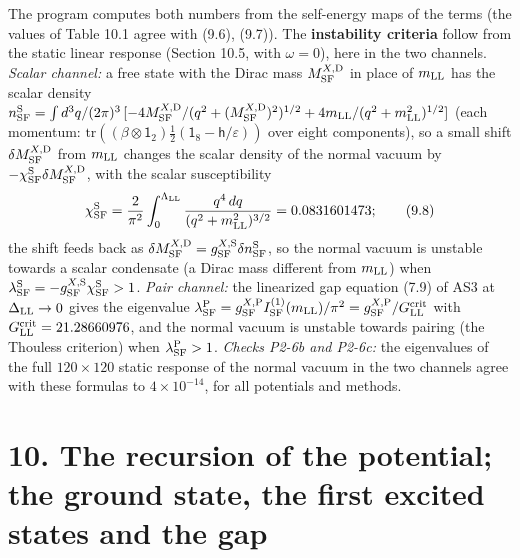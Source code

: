 \documentclass[
  10pt,
]{article}
\begin{document}
The program computes both numbers from the self-energy maps of the terms
(the values of Table 10.1 agree with (9.6), (9.7)). The
\textbf{instability criteria} follow from the static linear response
(Section 10.5, with \(\omega=0\)), here in the two channels.
\emph{Scalar channel:} a free state with the Dirac mass
\(M^{X,{\rm D}}_{\rm SF}\) in place of \(m_{\rm LL}\) has the scalar
density
\(n^{\rm S}_{\rm SF}=\int d^3q/(2\pi)^3\,[-4M^{X,{\rm D}}_{\rm SF}/(q^2+(M^{X,{\rm D}}_{\rm SF})^2)^{1/2}+4m_{\rm LL}/(q^2+m_{\rm LL}^2)^{1/2}]\)
(each momentum:
\(\mathrm{tr}((\beta\otimes\mathsf 1_2)\tfrac12(\mathsf 1_8-\mathsf h/\varepsilon))\)
over eight components), so a small shift
\(\delta M^{X,{\rm D}}_{\rm SF}\) from \(m_{\rm LL}\) changes the scalar
density of the normal vacuum by
\(-\chi^{\rm S}_{\rm SF}\delta M^{X,{\rm D}}_{\rm SF}\), with the scalar
susceptibility
\[\chi^{\rm S}_{\rm SF}=\frac2{\pi^2}\int_0^{\Lambda_{\rm LL}}\frac{q^4\,dq}{(q^2+m_{\rm LL}^2)^{3/2}}=0.0831601473;\tag{9.8}\]
the shift feeds back as
\(\delta M^{X,{\rm D}}_{\rm SF}=g^{X,{\rm S}}_{\rm SF}\delta n^{\rm S}_{\rm SF}\),
so the normal vacuum is unstable towards a scalar condensate (a Dirac
mass different from \(m_{\rm LL}\)) when
\(\lambda^{\rm S}_{\rm SF}=-g^{X,{\rm S}}_{\rm SF}\chi^{\rm S}_{\rm SF}>1\).
\emph{Pair channel:} the linearized gap equation (7.9) of AS3 at
\(\Delta_{\rm LL}\to0\) gives the eigenvalue
\(\lambda^{\rm P}_{\rm SF}=g^{X,{\rm P}}_{\rm SF}I^{(1)}_{\rm SF}(m_{\rm LL})/\pi^2=g^{X,{\rm P}}_{\rm SF}/G^{\rm crit}_{\rm LL}\)
with \(G^{\rm crit}_{\rm LL}=21.28660976\), and the normal vacuum is
unstable towards pairing (the Thouless criterion) when
\(\lambda^{\rm P}_{\rm SF}>1\). \emph{Checks P2-6b and P2-6c:} the
eigenvalues of the full \(120\times120\) static response of the normal
vacuum in the two channels agree with these formulas to
\(4\times10^{-14}\), for all potentials and methods.

\hypertarget{the-recursion-of-the-potential-the-ground-state-the-first-excited-states-and-the-gap}{%
\section{10. The recursion of the potential; the ground state, the first
excited states and the
gap}\label{the-recursion-of-the-potential-the-ground-state-the-first-excited-states-and-the-gap}}
\end{document}

